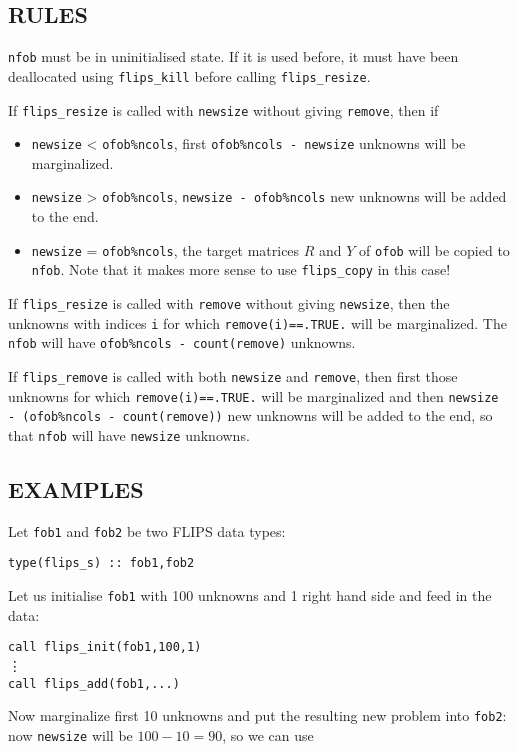 \documentclass[a4paper,twoside]{refrep}
\newcommand{\code}[1]{{\tt #1}}
\begin{document}
\subsection*{RULES}
\code{nfob} must be in uninitialised state. If it is used before, it must have been deallocated using \code{flips\_kill} before calling \code{flips\_resize}.

If \code{flips\_resize} is called with \code{newsize} without giving \code{remove}, then if
\begin{itemize}
\item \code{newsize} < \code{ofob\%ncols}, first \code{ofob\%ncols - newsize} unknowns will be marginalized. 
\item \code{newsize} > \code{ofob\%ncols}, \code{newsize - ofob\%ncols} new unknowns will be added to the end.
\item \code{newsize} = \code{ofob\%ncols}, the target matrices $R$ and $Y$ of \code{ofob} will be copied to \code{nfob}. Note that it makes more sense to use \code{flips\_copy} in this case!
\end{itemize}

If \code{flips\_resize} is called with \code{remove} without giving \code{newsize}, then the unknowns with indices \code{i} for which \code{remove(i)==.TRUE.} will be marginalized. The \code{nfob} will have \code{ofob\%ncols - count(remove)} unknowns. 

If \code{flips\_remove} is called with both \code{newsize} and \code{remove}, then first those unknowns for which \code{remove(i)==.TRUE.} will be marginalized and then \code{newsize - (ofob\%ncols - count(remove))} new unknowns will be added to the end, so that \code{nfob} will have \code{newsize} unknowns.

\subsection*{EXAMPLES}

 Let \code{fob1} and \code{fob2} be two FLIPS data types:

\code{type(flips\_s) :: fob1,fob2}

Let us initialise \code{fob1} with 100 unknowns and 1 right hand side and feed in the data:

\code{call flips\_init(fob1,100,1)}\\
\vdots\\
\code{call flips\_add(fob1,...)}

Now marginalize first 10 unknowns and put the resulting new problem into \code{fob2}: now \code{newsize} will be $100-10=90$, so we can use
\end{document}
